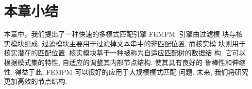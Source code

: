 \section{本章小结}
\label{sec:conclusion}

本章中，我们提出了一种快速的多模式匹配引擎 \textsf{FEMPM}. 引擎由过滤模
块与核实模块组成. 过滤模块主要用于过滤掉文本串中的非匹配位置, 而核实模
块则用于核实潜在的匹配位置. 核实模块基于一种被称为自适应匹配树的数据结
构, 它可以根据模式集的特性, 自适应的调整其内部节点结构, 使其具有良好的
鲁棒性和伸缩性. 得益于此, \textsf{FEMPM} 可以很好的应用于大规模模式匹配
问题. 未来, 我们将研究更加高效的节点结构.











